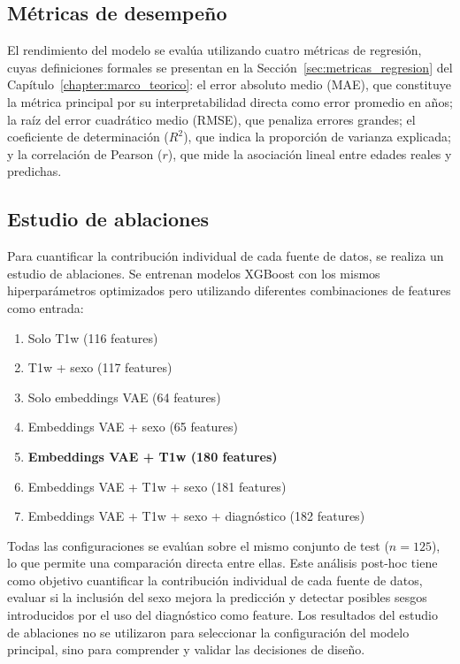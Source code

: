 \subsection{Métricas de desempeño}
\label{sec:metricas}

El rendimiento del modelo se evalúa utilizando cuatro métricas de regresión, cuyas definiciones formales se presentan en la Sección~\ref{sec:metricas_regresion} del Capítulo~\ref{chapter:marco_teorico}: el error absoluto medio (MAE), que constituye la métrica principal por su interpretabilidad directa como error promedio en años; la raíz del error cuadrático medio (RMSE), que penaliza errores grandes; el coeficiente de determinación ($R^2$), que indica la proporción de varianza explicada; y la correlación de Pearson ($r$), que mide la asociación lineal entre edades reales y predichas.

\subsection{Estudio de ablaciones}
\label{sec:ablaciones}

Para cuantificar la contribución individual de cada fuente de datos, se realiza un estudio de ablaciones. Se entrenan modelos XGBoost con los mismos hiperparámetros optimizados pero utilizando diferentes combinaciones de features como entrada:

\begin{enumerate}
    \item Solo T1w (116 features)
    \item T1w + sexo (117 features)
    \item Solo embeddings VAE (64 features)
    \item Embeddings VAE + sexo (65 features)
    \item \textbf{Embeddings VAE + T1w (180 features)}
    \item Embeddings VAE + T1w + sexo (181 features)
    \item Embeddings VAE + T1w + sexo + diagnóstico (182 features)
\end{enumerate}

Todas las configuraciones se evalúan sobre el mismo conjunto de test ($n = 125$), lo que permite una comparación directa entre ellas. Este análisis post-hoc tiene como objetivo cuantificar la contribución individual de cada fuente de datos, evaluar si la inclusión del sexo mejora la predicción y detectar posibles sesgos introducidos por el uso del diagnóstico como feature. Los resultados del estudio de ablaciones no se utilizaron para seleccionar la configuración del modelo principal, sino para comprender y validar las decisiones de diseño.

